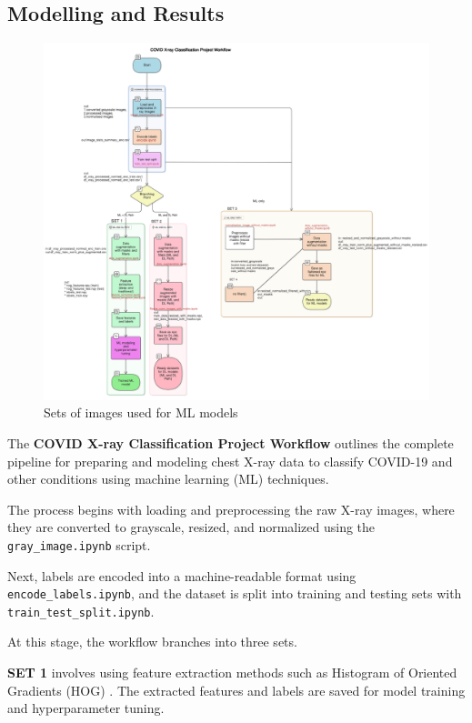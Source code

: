 \documentclass{article}
\begin{document}
\subsection{Modelling and Results}
\begin{figure}%
    \centering
    \includegraphics[width=1.0\linewidth]{diagram-export-5-8-2025-4_05_06-PM.png}
    \caption{Sets of images used for ML models}
    \label{fig:WORKFLOW}
\end{figure}
The \textbf{COVID X-ray Classification Project Workflow} outlines the complete pipeline for preparing and modeling chest X-ray data to classify COVID-19 and other conditions using machine learning (ML) techniques.

The process begins with loading and preprocessing the raw X-ray images, where they are converted to grayscale, resized, and normalized using the \texttt{gray\_image.ipynb} script.

Next, labels are encoded into a machine-readable format using \texttt{encode\_labels.ipynb}, and the dataset is split into training and testing sets with \texttt{train\_test\_split.ipynb}.

At this stage, the workflow branches into three sets.

\textbf{SET 1} involves using feature extraction methods such as Histogram of Oriented Gradients (HOG) . The extracted features and labels are saved for model training and hyperparameter tuning.
\end{document}
